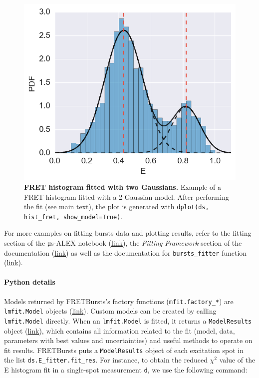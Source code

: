 \documentclass[10pt,letterpaper]{article}
\begin{document}
\begin{figure}[h!]
\begin{center}
\includegraphics[width=0.49\columnwidth]{figures/hist_fit/hist_fit}
\caption{\label{fig:histfit} \textbf{FRET histogram fitted with two Gaussians.}
Example of a FRET histogram fitted with a 2-Gaussian model.
After performing the fit (see main text), the plot is generated
with \texttt{dplot(ds, hist\_fret, show\_model=True)}.%
}
\end{center}
\end{figure}

For more examples on fitting bursts data and plotting results, refer to the
fitting section of the μs-ALEX notebook (\href{http://nbviewer.jupyter.org/github/tritemio/FRETBursts_notebooks/blob/master/notebooks/FRETBursts%20-%20us-ALEX%20smFRET%20burst%20analysis.ipynb#FRET-fit:-in-depth-example}{link}),
the \textit{Fitting Framework} section of the documentation
(\href{http://fretbursts.readthedocs.org/en/latest/fit.html}{link})
as well as the documentation for \verb|bursts_fitter| function
(\href{http://fretbursts.readthedocs.org/en/latest/plugins.html#fretbursts.burstlib_ext.bursts_fitter}{link}).

\paragraph*{Python details}

Models returned by FRETBursts's factory functions (\verb|mfit.factory_*|)
are \verb|lmfit.Model| objects (\href{https://lmfit.github.io/lmfit-py/model.html}{link}).
Custom models can be created by calling \verb|lmfit.Model| directly.
When an \verb|lmfit.Model| is fitted, it returns a \verb|ModelResults| object
(\href{https://lmfit.github.io/lmfit-py/model.html#the-modelresult-class}{link}),
which contains all information related to the fit (model, data,
parameters with best values and uncertainties) and useful methods to operate on fit results.
FRETBursts puts a \verb|ModelResults| object of each excitation spot in the list
\verb|ds.E_fitter.fit_res|.
For instance, to obtain the reduced $\chi^2$ value of the E histogram fit in a
single-spot measurement \verb|d|, we use the following command:
\end{document}
